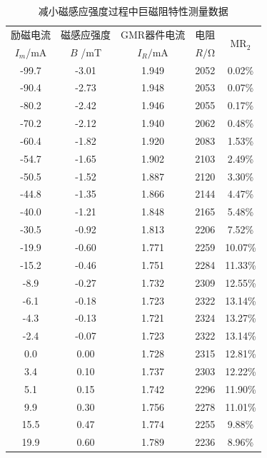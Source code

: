 \documentclass{thuemp}
\begin{document}
\begin{itemize}
\begin{table}[H]
    \centering
    \captionnamefont{\wuhao\bf\heiti}
    \captiontitlefont{\wuhao\bf\heiti}
    \caption{减小磁感应强度过程中巨磁阻特性测量数据} \label{tab:magnetoresistance_desc}
    \liuhao
    \begin{tabular}{ccccc}
        \toprule
        励磁电流 & 磁感应强度 & GMR器件电流 & 电阻 & \multirow{2}{*}{$\mathrm{MR_2}$}\\
        $I_m$/\si{\milli\ampere} & $B$ /\si{\milli\tesla} & $I_R$$ /\si{\milli\ampere}$ & $R$$/\si{\ohm} $& \\
        \midrule
        -99.7 & -3.01 & 1.949 & 2052 &  0.02\%  \\
        -90.4 & -2.73 & 1.948 & 2053 &  0.07\%  \\
        -80.2 & -2.42 & 1.946 & 2055 &  0.17\%  \\
        -70.2 & -2.12 & 1.940 & 2062 &  0.48\%  \\
        -60.4 & -1.82 & 1.920 & 2083 &  1.53\%  \\
        -54.7 & -1.65 & 1.902 & 2103 &  2.49\%  \\
        -50.5 & -1.52 & 1.887 & 2120 &  3.30\%  \\
        -44.8 & -1.35 & 1.866 & 2144 &  4.47\%  \\
        -40.0 & -1.21 & 1.848 & 2165 &  5.48\%  \\
        -30.5 & -0.92 & 1.813 & 2206 &  7.52\%  \\
        -19.9 & -0.60 & 1.771 & 2259 & 10.07\%  \\
        -15.2 & -0.46 & 1.751 & 2284 & 11.33\%  \\
        -8.9  & -0.27 & 1.732 & 2309 & 12.55\%  \\
        -6.1  & -0.18 & 1.723 & 2322 & 13.14\%  \\
        -4.3  & -0.13 & 1.721 & 2324 & 13.27\%  \\
        -2.4  & -0.07 & 1.723 & 2322 & 13.14\%  \\
        0.0   & 0.00  & 1.728 & 2315 & 12.81\%  \\
        3.4   & 0.10  & 1.737 & 2303 & 12.22\%  \\
        5.1   & 0.15  & 1.742 & 2296 & 11.90\%  \\
        9.9   & 0.30  & 1.756 & 2278 & 11.01\%  \\
        15.5  & 0.47  & 1.774 & 2255 &  9.88\%  \\
        19.9  & 0.60  & 1.789 & 2236 &  8.96\%  \\

\end{tabular}
\end{table}
\end{itemize}
\end{document}
